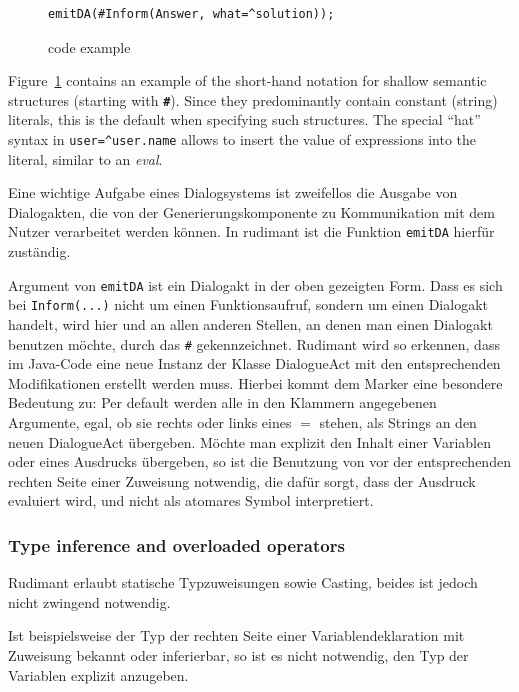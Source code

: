 \begin{figure}[htb]
  \centering\small%
\begin{verbatim}
emitDA(#Inform(Answer, what=^solution));
\end{verbatim}\vspace*{-3ex}
  \caption{\vonda code example}
  \label{fig:DA}
\end{figure}

Figure~\ref{fig:DA} contains an example of the short-hand notation
for shallow semantic structures (starting with \textbf{\texttt{\#}}).  Since
they predominantly contain constant (string) literals, this is the default when
specifying such structures. The special ``hat'' syntax in
\texttt{user=\^{}user.name} allows to insert the value of expressions into the
literal, similar to an \emph{eval}.

Eine wichtige Aufgabe eines Dialogsystems ist zweifellos die Ausgabe von
Dialogakten, die von der Generierungskomponente zu Kommunikation mit dem Nutzer
verarbeitet werden können. In rudimant ist die Funktion \texttt{emitDA} hierfür
zuständig.

Argument von \texttt{emitDA} ist ein Dialogakt in der oben gezeigten Form. Dass
es sich bei \texttt{Inform}\verb|(...)| nicht um einen Funktionsaufruf, sondern
um einen Dialogakt handelt, wird hier und an allen anderen Stellen, an denen
man einen Dialogakt benutzen möchte, durch das \verb|#|
gekennzeichnet. Rudimant wird so erkennen, dass im Java-Code eine neue Instanz
der Klasse DialogueAct mit den entsprechenden Modifikationen erstellt werden
muss. Hierbei kommt dem Marker \caret{} eine besondere Bedeutung zu: Per
default werden alle in den Klammern angegebenen Argumente, egal, ob sie rechts
oder links eines $=$ stehen, als Strings an den neuen DialogueAct
übergeben. Möchte man explizit den Inhalt einer Variablen oder eines Ausdrucks
übergeben, so ist die Benutzung von \caret{} vor der entsprechenden rechten
Seite einer Zuweisung notwendig, die dafür sorgt, dass der Ausdruck evaluiert
wird, und nicht als atomares Symbol interpretiert.

\subsubsection{Type inference and overloaded operators}
\label{sec:typeinference}

Rudimant erlaubt statische Typzuweisungen sowie Casting, beides ist jedoch
nicht zwingend notwendig.

Ist beispielsweise der Typ der rechten Seite einer Variablendeklaration mit
Zuweisung bekannt oder inferierbar, so ist es nicht notwendig, den Typ der
Variablen explizit anzugeben.

